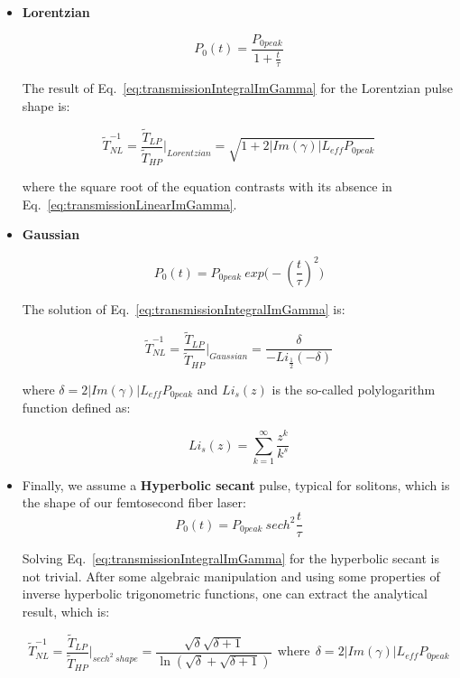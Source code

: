 \begin{itemize}
 \item \textbf{Lorentzian}

  \begin{equation}
  P_0(t) = \frac{P_{0 peak}}{1+\frac{t}{\tau}}
  \end{equation}

  The result of Eq.~\ref{eq:transmissionIntegralImGamma} for the Lorentzian pulse shape is:

  \begin{equation}
  \tilde{T}^{-1}_{NL}   = \frac{\tilde{T}_{LP}}{\tilde{T}_{HP}} \bigg|_{Lorentzian}  = \sqrt{1+2|Im(\gamma)| L_{eff} P_{0 peak}}
  \label{eq:transmissionLorentzianImGamma}
  \end{equation}

  where the square root of the equation contrasts with its absence in Eq.~\ref{eq:transmissionLinearImGamma}.


 \item \textbf{Gaussian}

\begin{equation}
 P_0(t) = P_{0 peak}~exp \big( - (\frac{t}{\tau})^2 \big)
\end{equation}

The solution of Eq.~\ref{eq:transmissionIntegralImGamma} is:

\begin{equation}
  \tilde{T}^{-1}_{NL}  = \frac{\tilde{T}_{LP}}{\tilde{T}_{HP}} \bigg|_{Gaussian}  = \frac{\delta}{-Li_{\frac{1}{2}}(-\delta)}
\label{eq:transmissionGaussianImGamma}
\end{equation}

where $ \delta = 2|Im(\gamma)| L_{eff} P_{0 peak} $ and $Li_s(z)$ is the so-called polylogarithm function defined as:

\begin{equation}
 Li_s(z) = \sum\limits_{k=1}^\infty \frac{z^k}{k^s}
\end{equation}


 \item Finally, we assume a \textbf{Hyperbolic secant} pulse, typical for solitons, which is the shape of our femtosecond fiber laser:
\begin{equation}
 P_0(t) = P_{0 peak}~sech^2 \frac{t}{\tau}
\end{equation}

Solving Eq.~\ref{eq:transmissionIntegralImGamma} for the hyperbolic secant is not trivial. After some algebraic manipulation and using some properties of inverse hyperbolic trigonometric functions, one can extract the analytical result, which is:


\begin{equation}
 \tilde{T}^{-1}_{NL}  = \frac{\tilde{T}_{LP}}{\tilde{T}_{HP}} \bigg|_{sech^2~shape}  = \frac{\sqrt{\delta}\sqrt{\delta + 1}}{\ln(\sqrt{\delta}+\sqrt{\delta+1})} ~~\mathrm{where}~~  \delta = 2|Im(\gamma)| L_{eff} P_{0 peak}
\label{eq:transmissionHypSecantImGamma}
\end{equation}


\end{itemize}


